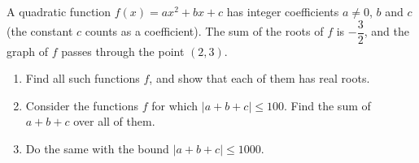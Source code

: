 A quadratic function $f(x)=ax^2+bx+c$ has integer coefficients $a\ne0$, $b$ and $c$ (the constant $c$ counts as a coefficient). The sum of the roots of $f$ is $-\dfrac32$, and the graph of $f$ passes through the point $(2,3)$.
\begin{enumerate}
\item[(a)] Find all such functions $f$, and show that each of them has real roots.
\item[(b)] Consider the functions $f$ for which $|a+b+c|\le100$. Find the sum of $a+b+c$ over all of them.
\item[(c)] Do the same with the bound $|a+b+c|\le1000$.
\end{enumerate}
